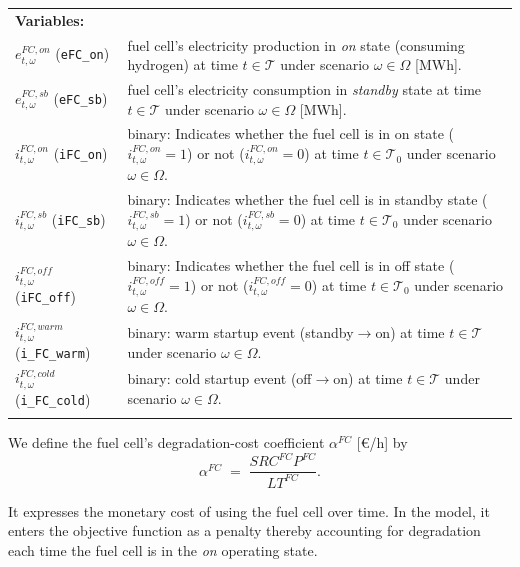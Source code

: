 \documentclass{article}
\begin{document}
\noindent
\begin{tabularx}{\textwidth}{@{}l X@{}}
    \textbf{Variables:} \\
    $e^{FC,on}_{t,\omega}$ (\verb|eFC_on|)
      & fuel cell's electricity production in \emph{on} state (consuming hydrogen)
        at time $t \in \mathcal{T}$ under scenario $\omega \in \Omega$ [MWh]. \\
    $e^{FC,sb}_{t,\omega}$ (\verb|eFC_sb|)
      & fuel cell's electricity consumption in \emph{standby} state
        at time $t \in \mathcal{T}$ under scenario $\omega \in \Omega$ [MWh]. \\
    $i^{FC,on}_{t,\omega}$ (\verb|iFC_on|)
      & binary: Indicates whether the fuel cell is in on state
        ($i^{FC,on}_{t,\omega} = 1$) or not ($i^{FC,on}_{t,\omega} = 0$)
        at time $t \in \mathcal{T}_0$ under scenario $\omega \in \Omega$. \\
    $i^{FC,sb}_{t,\omega}$ (\verb|iFC_sb|)
      & binary: Indicates whether the fuel cell is in standby state
        ($i^{FC,sb}_{t,\omega} = 1$) or not ($i^{FC,sb}_{t,\omega} = 0$)
        at time $t \in \mathcal{T}_0$ under scenario $\omega \in \Omega$. \\
    $i^{FC,off}_{t,\omega}$ (\verb|iFC_off|)
      & binary: Indicates whether the fuel cell is in off state
        ($i^{FC,off}_{t,\omega} = 1$) or not ($i^{FC,off}_{t,\omega} = 0$)
        at time $t \in \mathcal{T}_0$ under scenario $\omega \in \Omega$. \\
    $i^{FC,warm}_{t,\omega}$ (\verb|i_FC_warm|)
      & binary: warm startup event (standby$\rightarrow$on)
        at time $t \in \mathcal{T}$ under scenario $\omega \in \Omega$. \\
    $i^{FC,cold}_{t,\omega}$ (\verb|i_FC_cold|)
      & binary: cold startup event (off$\rightarrow$on)
        at time $t \in \mathcal{T}$ under scenario $\omega \in \Omega$. \\
    \\
\end{tabularx}

\medskip

We define the fuel cell's degradation-cost coefficient $\alpha^{FC}$ [\euro{}/h] by  
        \[
          \alpha^{FC} \;=\;
          \frac{SRC^{FC}  P^{FC}}
               {LT^{FC}}.
        \]

It expresses the monetary cost of using the fuel cell over time. In the model, it enters the objective function as a penalty thereby accounting for degradation each time the fuel cell is in the \emph{on} operating state.
\end{document}
